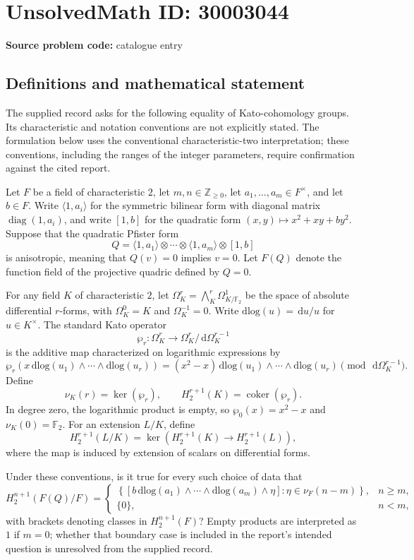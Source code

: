 \documentclass[11pt]{article}
\newcommand{\Z}{\mathbb{Z}}
\newcommand{\F}{\mathbb{F}}
\newcommand{\dd}{\,\mathrm{d}}
\begin{document}
\section*{UnsolvedMath ID: 30003044}
\textbf{Source problem code:} catalogue entry
\subsection{Definitions and mathematical statement}
The supplied record asks for the following equality of Kato-cohomology groups. Its characteristic and notation conventions are not explicitly stated. The formulation below uses the conventional characteristic-two interpretation; these conventions, including the ranges of the integer parameters, require confirmation against the cited report.

Let \(F\) be a field of characteristic \(2\), let \(m,n\in\Z_{\geq 0}\), let \(a_1,\ldots,a_m\in F^\times\), and let \(b\in F\). Write \(\langle 1,a_i\rangle\) for the symmetric bilinear form with diagonal matrix \(\operatorname{diag}(1,a_i)\), and write \([1,b]\) for the quadratic form \((x,y)\mapsto x^2+xy+by^2\). Suppose that the quadratic Pfister form
\[
Q=\langle 1,a_1\rangle\otimes\cdots\otimes\langle 1,a_m\rangle\otimes[1,b]
\]
is anisotropic, meaning that \(Q(v)=0\) implies \(v=0\). Let \(F(Q)\) denote the function field of the projective quadric defined by \(Q=0\).

For any field \(K\) of characteristic \(2\), let \(\Omega_K^r=\bigwedge_K^r\Omega^1_{K/\F_2}\) be the space of absolute differential \(r\)-forms, with \(\Omega_K^0=K\) and \(\Omega_K^{-1}=0\). Write \(\mathrm{dlog}(u)=\dd u/u\) for \(u\in K^\times\). The standard Kato operator
\[
\wp_r:\Omega_K^r\longrightarrow\Omega_K^r/\dd\Omega_K^{r-1}
\]
is the additive map characterized on logarithmic expressions by
\[
\wp_r\!\left(x\,\mathrm{dlog}(u_1)\wedge\cdots\wedge\mathrm{dlog}(u_r)\right)
=(x^2-x)\,\mathrm{dlog}(u_1)\wedge\cdots\wedge\mathrm{dlog}(u_r)
\pmod{\dd\Omega_K^{r-1}}.
\]
Define
\[
\nu_K(r)=\ker(\wp_r),\qquad
H_2^{r+1}(K)=\operatorname{coker}(\wp_r).
\]
In degree zero, the logarithmic product is empty, so \(\wp_0(x)=x^2-x\) and \(\nu_K(0)=\F_2\). For an extension \(L/K\), define
\[
H_2^{r+1}(L/K)=\ker\!\left(H_2^{r+1}(K)\longrightarrow H_2^{r+1}(L)\right),
\]
where the map is induced by extension of scalars on differential forms.

Under these conventions, is it true for every such choice of data that
\[
H_2^{n+1}(F(Q)/F)=
\begin{cases}
\left\{\left[b\,\mathrm{dlog}(a_1)\wedge\cdots\wedge\mathrm{dlog}(a_m)\wedge\eta\right]:\eta\in\nu_F(n-m)\right\},&n\geq m,\\[4pt]
\{0\},&n<m,
\end{cases}
\]
with brackets denoting classes in \(H_2^{n+1}(F)\)? Empty products are interpreted as \(1\) if \(m=0\); whether that boundary case is included in the report's intended question is unresolved from the supplied record.
\end{document}

